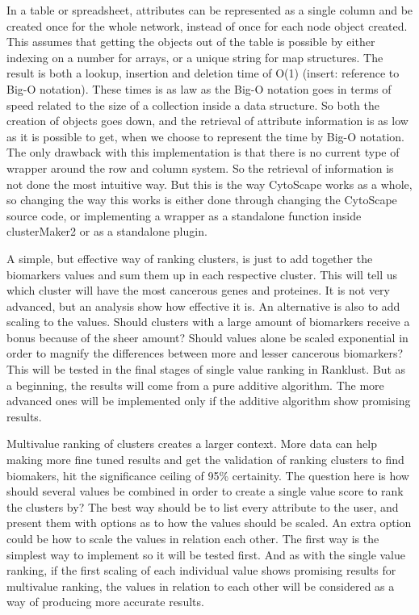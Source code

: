 \documentclass[UKenglish]{ifimaster}
\begin{document}
In a table or spreadsheet, attributes can be represented as a single column and
be created once for the whole network, instead of once for each node object
created. This assumes that getting the objects out of the table is possible by
either indexing on a number for arrays, or a unique string for map structures.
The result is both a lookup, insertion and deletion time of O(1) (insert:
reference to Big-O notation).  These times is as law as the Big-O notation goes
in terms of speed related to the size of a collection inside a data structure.
So both the creation of objects goes down, and the retrieval of attribute
information is as low as it is possible to get, when we choose to represent the
time by Big-O notation. The only drawback with this implementation is that there
is no current type of wrapper around the row and column system. So the retrieval
of information is not done the most intuitive way. But this is the way CytoScape
works as a whole, so changing the way this works is either done through changing
the CytoScape source code, or implementing a wrapper as a standalone function
inside clusterMaker2 or as a standalone plugin.

A simple, but effective way of ranking clusters, is just to add together the
biomarkers values and sum them up in each respective cluster. This will tell us
which cluster will have the most cancerous genes and proteines. It is not very
advanced, but an analysis show how effective it is. An alternative is also to
add scaling to the values. Should clusters with a large amount of biomarkers
receive a bonus because of the sheer amount? Should values alone be scaled
exponential in order to magnify the differences between more and lesser
cancerous biomarkers? This will be tested in the final stages of single value
ranking in Ranklust. But as a beginning, the results will come from a pure
additive algorithm.  The more advanced ones will be implemented only if the
additive algorithm show promising results.

Multivalue ranking of clusters creates a larger context. More data can help
making more fine tuned results and get the validation of ranking clusters to
find biomakers, hit the significance ceiling of 95\% certainity. 
The question here is how should several values be combined in order to create a
single value score to rank the clusters by? The best way should be to list every
attribute to the user, and present them with options as to how the values should
be scaled. An extra option could be how to scale the values in relation each
other. The first way is the simplest way to implement so it will be tested
first. And as with the single value ranking, if the first scaling of each
individual value shows promising results for multivalue ranking, the values in
relation to each other will be considered as a way of producing more accurate
results.
\end{document}
